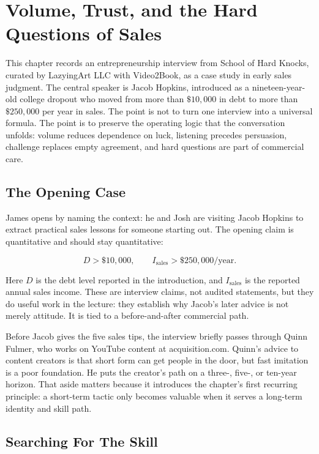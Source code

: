 \chapter{Volume, Trust, and the Hard Questions of Sales}

This chapter records an entrepreneurship interview from School of Hard Knocks, curated by LazyingArt LLC with Video2Book, as a case study in early sales judgment. The central speaker is Jacob Hopkins, introduced as a nineteen-year-old college dropout who moved from more than \(\$10{,}000\) in debt to more than \(\$250{,}000\) per year in sales. The point is not to turn one interview into a universal formula. The point is to preserve the operating logic that the conversation unfolds: volume reduces dependence on luck, listening precedes persuasion, challenge replaces empty agreement, and hard questions are part of commercial care.

\section{The Opening Case}

James opens by naming the context: he and Josh are visiting Jacob Hopkins to extract practical sales lessons for someone starting out. The opening claim is quantitative and should stay quantitative:

\begin{equation}
D > \$10{,}000,
\qquad
I_{\mathrm{sales}} > \$250{,}000/\mathrm{year}.
\end{equation}

Here \(D\) is the debt level reported in the introduction, and \(I_{\mathrm{sales}}\) is the reported annual sales income. These are interview claims, not audited statements, but they do useful work in the lecture: they establish why Jacob's later advice is not merely attitude. It is tied to a before-and-after commercial path.

Before Jacob gives the five sales tips, the interview briefly passes through Quinn Fulmer, who works on YouTube content at acquisition.com. Quinn's advice to content creators is that short form can get people in the door, but fast imitation is a poor foundation. He puts the creator's path on a three-, five-, or ten-year horizon. That aside matters because it introduces the chapter's first recurring principle: a short-term tactic only becomes valuable when it serves a long-term identity and skill path.

\section{Searching For The Skill}

